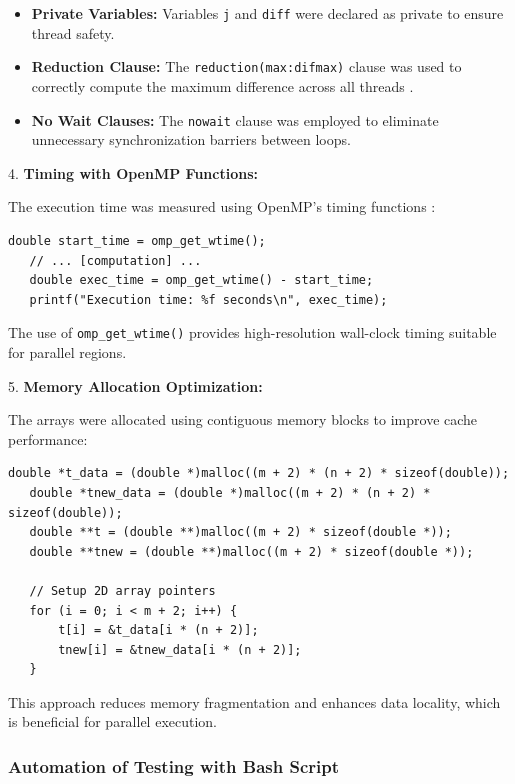 \documentclass{article}
\begin{document}
    \begin{itemize}
        \item \textbf{Private Variables:} Variables \texttt{j} and \texttt{diff} were declared as private to ensure thread safety.
        \item \textbf{Reduction Clause:} The \texttt{reduction(max:difmax)} clause was used to correctly compute the maximum difference across all threads \parencite{chapman2007openmp}.
        \item \textbf{No Wait Clauses:} The \texttt{nowait} clause was employed to eliminate unnecessary synchronization barriers between loops.
    \end{itemize}

4. \textbf{Timing with OpenMP Functions:}

    The execution time was measured using OpenMP's timing functions \parencite{openmp}:

   \begin{lstlisting}[style=CStyle, caption={Timing with OpenMP Functions}]
   double start_time = omp_get_wtime();
   // ... [computation] ...
   double exec_time = omp_get_wtime() - start_time;
   printf("Execution time: %f seconds\n", exec_time);
   \end{lstlisting}

   The use of \texttt{omp\_get\_wtime()} provides high-resolution wall-clock timing suitable for parallel regions.

5. \textbf{Memory Allocation Optimization:}

   The arrays were allocated using contiguous memory blocks to improve cache performance:

   \begin{lstlisting}[style=CStyle, caption={Memory Allocation Optimization}]
   double *t_data = (double *)malloc((m + 2) * (n + 2) * sizeof(double));
   double *tnew_data = (double *)malloc((m + 2) * (n + 2) * sizeof(double));
   double **t = (double **)malloc((m + 2) * sizeof(double *));
   double **tnew = (double **)malloc((m + 2) * sizeof(double *));

   // Setup 2D array pointers
   for (i = 0; i < m + 2; i++) {
       t[i] = &t_data[i * (n + 2)];
       tnew[i] = &tnew_data[i * (n + 2)];
   }
   \end{lstlisting}

   This approach reduces memory fragmentation and enhances data locality, which is beneficial for parallel execution.

\subsubsection{Automation of Testing with Bash Script}
\end{document}
